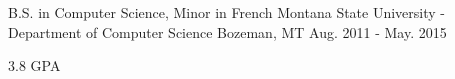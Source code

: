 

\begin{cventries}

  \cventry
    {B.S. in Computer Science, Minor in French} %
    {Montana State University - Department of Computer Science} %
    {Bozeman, MT} %
    {Aug. 2011 - May. 2015} %
    {
      \begin{cvitems} %
        \item {3.8 GPA}
      \end{cvitems}
    }

\end{cventries}
